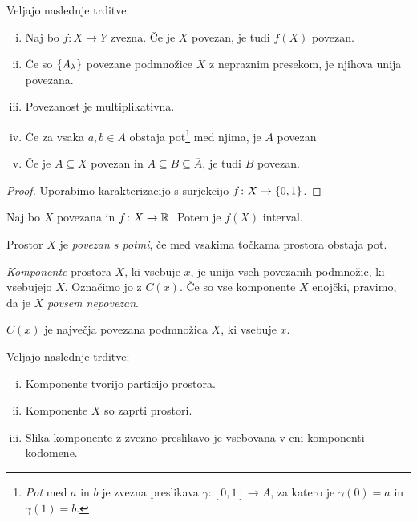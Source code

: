 \begin{izrek}
Veljajo naslednje trditve:

\begin{enumerate}[i)]
\item Naj bo $f \colon X \to Y$ zvezna. Če je $X$ povezan, je tudi
$f(X)$ povezan.
\item Če so $\left\{A_\lambda\right\}$ povezane podmnožice $X$ z nepraznim
presekom, je njihova unija povezana.
\item Povezanost je multiplikativna.
\item Če za vsaka $a, b \in A$ obstaja pot\footnote{\emph{Pot} med
$a$ in $b$ je zvezna preslikava $\gamma \colon [0,1] \to A$, za
katero je $\gamma(0) = a$ in $\gamma(1) = b$.} med njima, je $A$
povezan
\item Če je $A \subseteq X$ povezan in
$A \subseteq B \subseteq \overline{A}$, je tudi $B$ povezan.
\end{enumerate}
\end{izrek}

\begin{proof}
Uporabimo karakterizacijo s surjekcijo $f \colon X \to \left\{0,1\right\}$.
\end{proof}

\begin{izrek}
Naj bo $X$ povezana in $f \colon X \to \mathbb{R}$. Potem je $f(X)$
interval.
\end{izrek}

\obvs

\begin{definicija}
Prostor $X$ je \emph{povezan s potmi}, če med vsakima točkama
prostora obstaja pot.
\end{definicija}

\begin{definicija}
\emph{Komponente}
prostora $X$, ki vsebuje $x$, je unija vseh povezanih podmnožic,
ki vsebujejo $X$. Označimo jo z $C(x)$. Če so vse komponente $X$
enojčki, pravimo, da je $X$ \emph{povsem nepovezan}.
\end{definicija}

\begin{opomba}
$C(x)$ je največja povezana podmnožica $X$, ki vsebuje $x$.
\end{opomba}

\begin{izrek}
Veljajo naslednje trditve:

\begin{enumerate}[i)]
\item Komponente tvorijo particijo prostora.
\item Komponente $X$ so zaprti prostori.
\item Slika komponente z zvezno preslikavo je vsebovana v
eni komponenti kodomene.
\end{enumerate}
\end{izrek}

